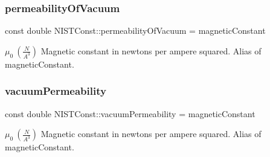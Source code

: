 \subsubsection{\texorpdfstring{permeability\+Of\+Vacuum}{permeabilityOfVacuum}}
{\footnotesize\ttfamily const double N\+I\+S\+T\+Const\+::permeability\+Of\+Vacuum = magnetic\+Constant}

$\mu_0 \ (\frac{N}{A^3})$ Magnetic constant in newtons per ampere squared. Alias of magnetic\+Constant. \mbox{\label{group___magnetic_constant_ga2bf51bbe9c6b75752250c9b133758223}} 
\subsubsection{\texorpdfstring{vacuum\+Permeability}{vacuumPermeability}}
{\footnotesize\ttfamily const double N\+I\+S\+T\+Const\+::vacuum\+Permeability = magnetic\+Constant}

$\mu_0 \ (\frac{N}{A^3})$ Magnetic constant in newtons per ampere squared. Alias of magnetic\+Constant. 